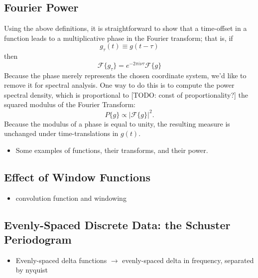 \documentclass[preprint]{aastex}
\newcommand{\todo}[1]{{\color{red} [TODO: #1]}}
\begin{document}
\subsection{Fourier Power}

Using the above definitions, it is straightforward to show that a time-offset in a function leads to a multiplicative phase in the Fourier transform; that is, if
\begin{equation}
  g_\tau(t) \equiv g(t - \tau)
\end{equation}
then 
\begin{equation}
  \mathcal{F}\{g_\tau\} = e^{-2\pi i \nu \tau}\mathcal{F}\{g\}
\end{equation}
Because the phase merely represents the chosen coordinate system, we'd like to remove it for spectral analysis.
One way to do this is to compute the power spectral density, which is proportional to \todo{const of proportionality?} the squared modulus of the Fourier Transform:
\begin{equation}
  P\{g\} \propto \left| \mathcal{F}\{g\} \right|^2.
\end{equation}
Because the modulus of a phase is equal to unity, the resulting measure is unchanged under time-translations in $g(t)$.

\begin{itemize}
\item Some examples of functions, their transforms, and their power.
\end{itemize}

\subsection{Effect of Window Functions}

\begin{itemize}
\item convolution function and windowing
\end{itemize}

\subsection{Evenly-Spaced Discrete Data: the Schuster Periodogram}

\begin{itemize}
\item Evenly-spaced delta functions $\to$ evenly-spaced delta in frequency, separated by nyquist
\end{itemize}
\end{document}
